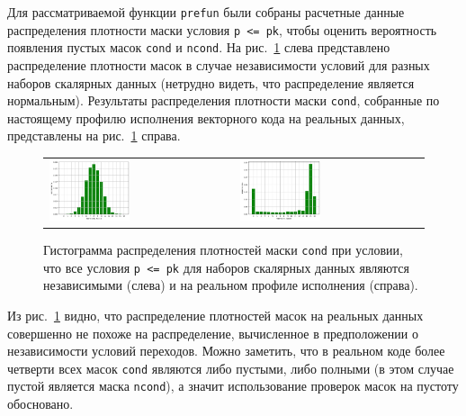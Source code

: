 Для рассматриваемой функции \texttt{prefun} были собраны расчетные данные распределения плотности маски условия \texttt{p <= pk}, чтобы оценить вероятность появления пустых масок \texttt{cond} и \texttt{ncond}.
На рис.~\ref{fig:text_4_vec_comb_mask_independent_p} слева представлено распределение плотности масок в случае независимости условий для разных наборов скалярных данных (нетрудно видеть, что распределение является нормальным).
Результаты распределения плотности маски \texttt{cond}, собранные по настоящему профилю исполнения векторного кода на реальных данных, представлены на рис.~\ref{fig:text_4_vec_comb_mask_independent_p} справа.

\begin{figure}[ht]
\centering
\begin{tabular}{ll}
\includegraphics[width=0.45\textwidth]{./pics/text_4_vec_comb_mask/independent_p.png}
&
\includegraphics[width=0.45\textwidth]{./pics/text_4_vec_comb_mask/real_p.png}
\end{tabular}
\singlespacing
{}\caption{Гистограмма распределения плотностей маски \texttt{cond} при условии, что все условия \texttt{p <= pk} для наборов скалярных данных являются независимыми (слева) и на реальном профиле исполнения (справа).}
\label{fig:text_4_vec_comb_mask_independent_p}
\end{figure}

Из рис.~\ref{fig:text_4_vec_comb_mask_independent_p} видно, что распределение плотностей масок на реальных данных совершенно не похоже на распределение, вычисленное в предположении о независимости условий переходов.
Можно заметить, что в реальном коде более четверти всех масок \texttt{cond} являются либо пустыми, либо полными (в этом случае пустой является маска \texttt{ncond}), а значит использование проверок масок на пустоту обосновано.


